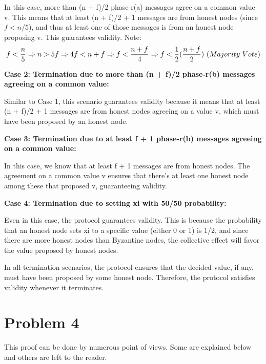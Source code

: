 \documentclass{article}
\begin{document}
\begin{enumerate}
In this case, more than (n + f)/2 phase-r(a) messages agree on a common value v. This means that at least (n + f)/2 + 1 messages are from honest nodes (since $f < n/5$), and thus at least one of those messages is from an honest node proposing v. This guarantees validity.
Note:
$$ 
f < \frac{n}{5} \Rightarrow n > 5f \Rightarrow 4f < n + f \Rightarrow \newline
f< \frac{n + f}{4} \Rightarrow f< \frac{1}{2}(\frac{n + f}{2}) \ (Majority \ Vote)
$$

\textbf{Case 2: Termination due to more than (n + f)/2 phase-r(b) messages agreeing on a common value:}

Similar to Case 1, this scenario guarantees validity because it means that at least (n + f)/2 + 1 messages are from honest nodes agreeing on a value v, which must have been proposed by an honest node.

\textbf{Case 3: Termination due to at least f + 1 phase-r(b) messages agreeing on a common value:}

In this case, we know that at least f + 1 messages are from honest nodes. The agreement on a common value v ensures that there's at least one honest node among these that proposed v, guaranteeing validity.

\textbf{Case 4: Termination due to setting xi with 50/50 probability:}

Even in this case, the protocol guarantees validity. This is because the probability that an honest node sets xi to a specific value (either 0 or 1) is 1/2, and since there are more honest nodes than Byzantine nodes, the collective effect will favor the value proposed by honest nodes.

In all termination scenarios, the protocol ensures that the decided value, if any, must have been proposed by some honest node. Therefore, the protocol satisfies validity whenever it terminates.



\end{enumerate}



\section*{Problem 4}

This proof can be done by numerous point of views. Some are explained below and others are left to the reader.
\end{document}
